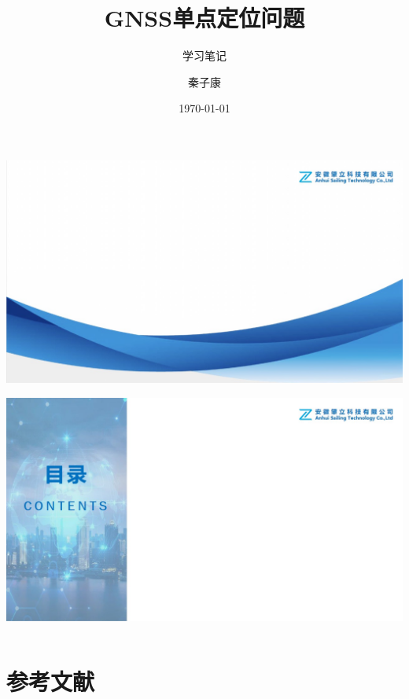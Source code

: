 \documentclass{beamer}
\author{秦子康}
\title{GNSS单点定位问题}
\subtitle{学习笔记}
\institute{安徽肇立科技有限公司}
\date{\today}
\begin{document}
\kaishu

{
{
    \includegraphics[width=\paperwidth,height=\paperheight]{pic/front_page.jpg}
}
\begin{frame}
    \titlepage
\end{frame}
}

{
{
    \includegraphics[width=\paperwidth,height=\paperheight]{pic/outline_page.jpg}
}
\begin{frame}
\begin{columns}
    \tableofcontents[sectionstyle=show,subsectionstyle=show/shaded/hide,subsubsectionstyle=show/shaded/hide]
\end{columns}
\end{frame}
}







\section{参考文献}
\end{document}
